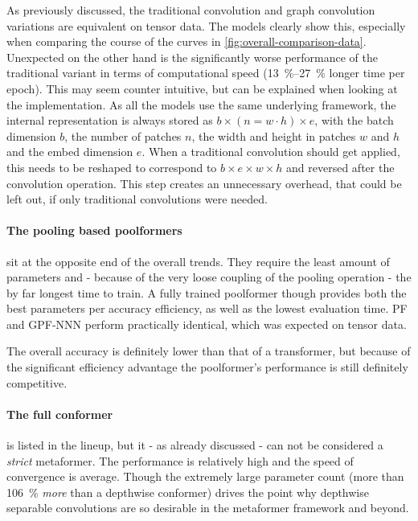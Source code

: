 As previously discussed, the traditional convolution and graph convolution variations are equivalent on tensor data.
The models clearly show this, especially when comparing the course of the curves in \autoref{fig:overall-comparison-data}.
Unexpected on the other hand is the significantly worse performance of the traditional variant in terms of computational speed (\SIrange{13}{27}{\percent} longer time per epoch).
This may seem counter intuitive, but can be explained when looking at the implementation. 
As all the models use the same underlying framework, the internal representation is always stored as $b \times (n=w\cdot h) \times e$, with the batch dimension $b$, the number of patches $n$, the width and height in patches $w$ and $h$ and the embed dimension $e$. 
When a traditional convolution should get applied, this needs to be reshaped to correspond to $b \times e \times w \times h$ and reversed after the convolution operation. 
This step creates an unnecessary overhead, that could be left out, if only traditional convolutions were needed.

\paragraph{The pooling based poolformers} sit at the opposite end of the overall trends.
They require the least amount of parameters and - because of the very loose coupling of the pooling operation - the by far longest time to train.
A fully trained poolformer though provides both the best parameters per accuracy efficiency, as well as the lowest evaluation time.
PF and GPF-NNN perform practically identical, which was expected on tensor data.

The overall accuracy is definitely lower than that of a transformer, but because of the significant efficiency advantage the poolformer's performance is still definitely competitive.

\paragraph{The full conformer} is listed in the lineup, but it - as already discussed - can not be considered a \emph{strict} metaformer.
The performance is relatively high and the speed of convergence is average. 
Though the extremely large parameter count (more than \SI[]{106}[]{\percent} \emph{more} than a depthwise conformer) drives the point why depthwise separable convolutions are so desirable in the metaformer framework and beyond.
